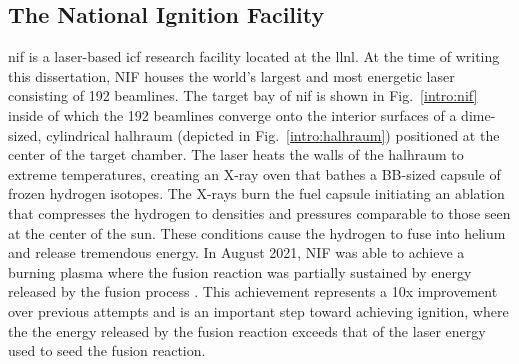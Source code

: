 \documentclass[../doc.tex]{subfiles}
\begin{document}
\subsection{The National Ignition Facility}
\gls{nif} is a laser-based \gls{icf} research facility located at the \gls{llnl}. At the time of writing this dissertation, NIF houses the world's largest and most energetic laser consisting of 192 beamlines. The target bay of \gls{nif} is shown in Fig.~\ref{intro:nif} inside of which the 192 beamlines converge onto the interior surfaces of a dime-sized, cylindrical halhraum (depicted in Fig.~\ref{intro:halhraum}) positioned at the center of the target chamber. The laser heats the walls of the halhraum to extreme temperatures, creating an X-ray oven that bathes a BB-sized capsule of frozen hydrogen isotopes. The X-rays burn the fuel capsule initiating an ablation that compresses the hydrogen to densities and pressures comparable to those seen at the center of the sun. These conditions cause the hydrogen to fuse into helium and release tremendous energy. In August 2021, NIF was able to achieve a burning plasma where the fusion reaction was partially sustained by energy released by the fusion process \cite{Zylstra2022}. This achievement represents a 10x improvement over previous attempts and is an important step toward achieving ignition, where the the energy released by the fusion reaction exceeds that of the laser energy used to seed the fusion reaction. 
\end{document}
